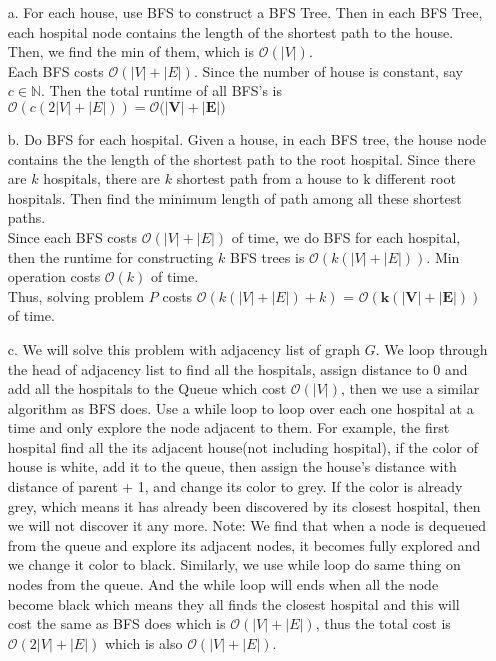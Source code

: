 \documentclass[10pt]{article}
\begin{document}
\begin{itemize}
\item[a.]
For each house, use BFS to construct a BFS Tree. Then in each BFS Tree, each hospital node contains the length of the shortest path to the house. Then, we find the min of them, which is $\mathcal{O}(|V|)$.\\
Each BFS costs $\mathcal{O}(|V|+|E|)$. Since the number of house is constant, say $c\in\mathbb{N}$. Then the total runtime of all BFS's is $\mathcal{O}(c(2|V|+|E|))=\boldsymbol{\mathcal{O}(|V|+|E|})$
\item[b.]
Do BFS for each hospital. Given a house, in each BFS tree, the house node contains the the length of the shortest path to the root hospital. Since there are $k$ hospitals, there are $k$ shortest path from a house to k different root hospitals. Then find the minimum length of path among all these shortest paths.\\
Since each BFS costs $\mathcal{O}(|V|+|E|)$ of time, we do BFS for each hospital, then the runtime for constructing $k$ BFS trees is $\mathcal{O}(k(|V|+|E|))$. Min operation costs $\mathcal{O}(k)$ of time.\\
Thus, solving problem $P$ costs $\mathcal{O}(k(|V|+|E|)+k)$ = $\boldsymbol{\mathcal{O}(k(|V|+|E|))}$ of time.
\item[c.]
We will solve this problem with adjacency list of graph $G$. We loop through the head of adjacency list to find all the hospitals, assign distance to 0 and add all the hospitals to the Queue which cost $\mathcal{O}(|V|)$, then we use a similar algorithm as BFS does. Use a while loop to loop over each one hospital at a time and only explore the node adjacent to them. For example, the first hospital find all the its adjacent house(not including hospital), if the color of house is white, add it to the queue, then assign the house's distance with distance of parent + 1,  and change its color to grey. If the color is already grey, which means it has already been discovered by its closest hospital, then we will not discover it any more. Note: We find that when a node is dequeued from the queue and explore its adjacent nodes, it becomes fully explored and we change it color to black. Similarly, we use while loop do same thing on nodes from the queue. And the while loop will ends when all the node become black which means they all finds the closest hospital and this will cost the same as BFS does which is $\mathcal{O}(|V|+|E|)$, thus the total cost is $\mathcal{O}(2|V| + |E|)$ which is also $\mathcal{O}(|V| + |E|)$.

\end{itemize}
\end{document}
